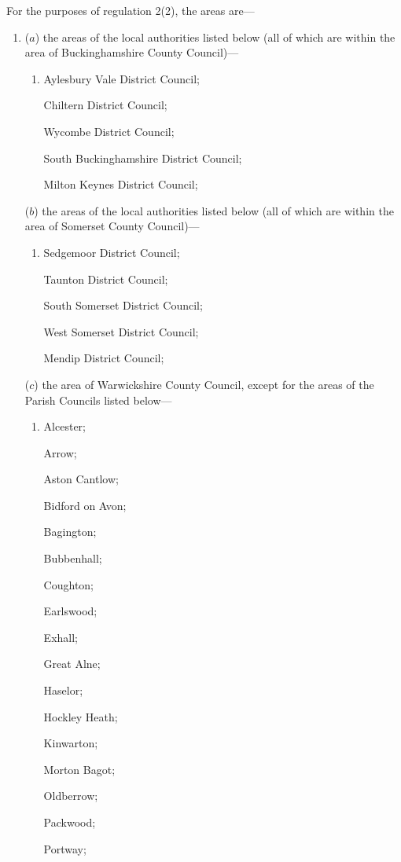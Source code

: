 \documentclass[12pt,a4paper]{article}
\begin{document}
For the purposes of regulation 2(2), the areas are—
\begin{enumerate}\item[]
($a$) the areas of the local authorities listed below (all of which are within the area of Buckinghamshire County Council)—
\begin{enumerate}\item[]
    Aylesbury Vale District Council;

    Chiltern District Council;

    Wycombe District Council;

    South Buckinghamshire District Council;

    Milton Keynes District Council; 
\end{enumerate}

($b$) the areas of the local authorities listed below (all of which are within the area of Somerset County Council)—
\begin{enumerate}\item[]
    Sedgemoor District Council;

    Taunton District Council;

    South Somerset District Council;

    West Somerset District Council;

    Mendip District Council; 
\end{enumerate}

($c$) the area of Warwickshire County Council, except for the areas of the Parish Councils listed below—
\begin{enumerate}\item[]
    Alcester;

    Arrow;

    Aston Cantlow;

    Bidford on Avon;

    Bagington;

    Bubbenhall;

    Coughton;

    Earlswood;

    Exhall;

    Great Alne;

    Haselor;

    Hockley Heath;

    Kinwarton;

    Morton Bagot;

    Oldberrow;

    Packwood;

    Portway;


\end{enumerate}
\end{enumerate}
\end{document}
